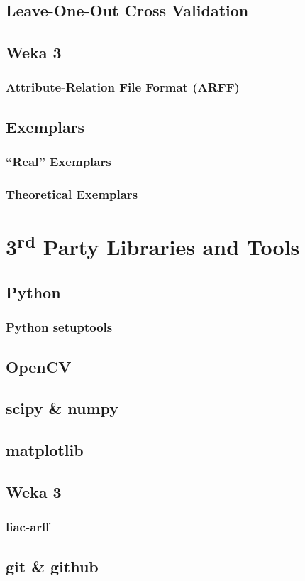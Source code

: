 \subsection{Leave-One-Out Cross Validation}

\subsection{Weka 3}
\subsubsection{Attribute-Relation File Format (ARFF)}

\subsection{Exemplars}
\subsubsection{``Real'' Exemplars}
\subsubsection{Theoretical Exemplars}


\section{3\textsuperscript{rd} Party Libraries and Tools}

\subsection{Python}
\subsubsection{Python setuptools}

\subsection{OpenCV}

\subsection{scipy \& numpy}

\subsection{matplotlib}

\subsection{Weka 3}
\subsubsection{liac-arff}

\subsection{git \& github}


